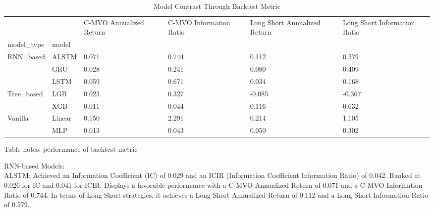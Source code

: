 \documentclass[10pt,letterpaper]{article}
\begin{document}
\begin{table}[!ht]
\centering
\caption{Model Contrast Through Backtest Metric}
\begin{tabular}{llp{1.5cm}p{1.5cm}p{1.5cm}p{1.5cm}}
\toprule
        &     &  C-MVO Annualized Return &  C-MVO Information Ratio &  Long Short Annualized Return &  Long Short Information Ratio \\
model\_type & model &                          &                          &                               &                               \\
\midrule
RNN\_based & ALSTM &                    0.071 &                    0.744 &                         0.112 &                         0.579 \\
        & GRU &                    0.028 &                    0.241 &                         0.080 &                         0.409 \\
        & LSTM &                    0.059 &                    0.671 &                         0.034 &                         0.168 \\
Tree\_based & LGB &                    0.023 &                    0.327 &                        -0.085 &                        -0.367 \\
        & XGB &                    0.011 &                    0.044 &                         0.116 &                         0.632 \\
Vanilla & Linear &                    0.150 &                    2.291 &                         0.214 &                         1.105 \\
        & MLP &                    0.013 &                    0.043 &                         0.050 &                         0.302 \\
\bottomrule
\end{tabular}




\begin{flushleft}
Table notes: performance of backtest metric
\end{flushleft}
\label{table1}

\end{table}
RNN-based Models:
\\ALSTM: Achieved an Information Coefficient (IC) of 0.029 and an ICIR (Information Coefficient Information Ratio) of 0.042. Ranked at 0.026 for IC and 0.041 for ICIR. Displays a favorable performance with a C-MVO Annualized Return of 0.071 and a C-MVO Information Ratio of 0.744. In terms of Long-Short strategies, it achieves a Long Short Annualized Return of 0.112 and a Long Short Information Ratio of 0.579.
\end{document}
